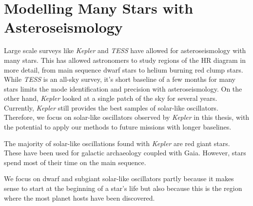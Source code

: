 \section[Modelling Stars with Asteroseismology]{Modelling Many Stars with Asteroseismology}

Large scale surveys like \emph{Kepler} and \emph{TESS} have allowed for asteroseismology with many stars. This has allowed astronomers to study regions of the HR diagram in more detail, from main sequence dwarf stars to helium burning red clump stars. While \emph{TESS} is an all-sky survey, it's short baseline of a few months for many stars limits the mode identification and precision with asteroseismology. On the other hand, \emph{Kepler} looked at a single patch of the sky for several years. Currently, \emph{Kepler} still provides the best samples of solar-like oscillators. Therefore, we focus on solar-like oscillators observed by \emph{Kepler} in this thesis, with the potential to apply our methods to future missions with longer baselines.

The majority of solar-like oscillations found with \emph{Kepler} are red giant stars. These have been used for galactic archaeology coupled with Gaia. However, stars spend most of their time on the main sequence. 

We focus on dwarf and subgiant solar-like oscillators partly because it makes sense to start at the beginning of a star's life but also because this is the region where the most planet hosts have been discovered.

